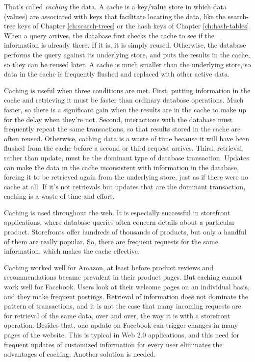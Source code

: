 That's called \emph{caching} the data.
A cache is a key/value store
in which data (values) are associated with keys
that facilitate locating the data,
like the search-tree keys of Chapter \ref{ch:search-trees}
or the hash keys of Chapter \ref{ch:hash-tables}.
When a query arrives, the database first checks
the cache to see if the information is already there.
If it is, it is simply reused.
Otherwise, the database performs the query against its underlying store,
and puts the results in the cache, so they can be reused later.
A cache is much smaller than the underlying store,
so data in the cache is frequently flushed and replaced with other active data.

Caching is useful when three conditions are met.
First, putting information in the cache and retrieving it
must be faster than ordinary database operations.
Much faster, so there is a significant gain
when the results are in the cache to make up for the delay when they're not.
Second, interactions with the database must frequently repeat the same transactions,
so that results stored in the cache are often reused.
Otherwise, caching data is a waste of time because it will
have been flushed from the cache before a second or third request arrives.
Third, retrieval,
rather than update, must be the dominant type of database transaction.
Updates can make the data in the cache inconsistent with information in the database,
forcing it to be retrieved again from the underlying store,
just as if there were no cache at all.
If it's not retrievals but updates that are the dominant transaction,
caching is a waste of time and effort.

Caching is used throughout the web.
It is especially successful in storefront applications,
where database queries often concern details about a particular product.
Storefronts offer hundreds of thousands of products,
but only a handful of them are really popular.
So, there are frequent requests for the same information,
which makes the cache effective.

Caching worked well for Amazon, at least before product reviews
and recommendations became prevalent in their product pages.
But caching cannot work well for Facebook.
Users look at their welcome pages on an individual basis,
and they make frequent postings. Retrieval of information
does not dominate the pattern of transactions,
and it is not the case that many incoming requests
are for retrieval of the same data, over and over,
the way it is with a storefront operation.
Besides that, one update on Facebook can trigger changes in many pages of the website.
This is typical in Web 2.0 applications,
and this need for frequent updates of customized information
for every user eliminates the advantages of caching.
Another solution is needed.

